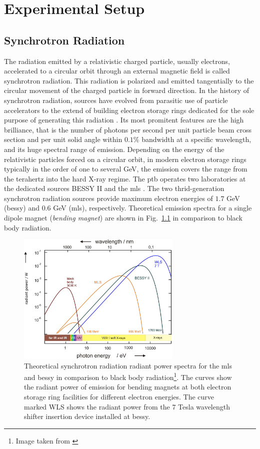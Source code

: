 \chapter{Experimental Setup}
\section{Synchrotron Radiation}
The radiation emitted by a relativistic charged particle, usually electrons, accelerated to a circular orbit through an external magnetic field is called synchrotron radiation. This radiation is polarized and emitted tangentially to the circular movement of the charged particle in forward direction. In the history of synchrotron radiation, sources have evolved from parasitic use of particle accelerators to the extend of building electron storage rings dedicated for the sole purpose of generating this radiation \cite{munro_chapter_1987}. Its most promitent features are the high brilliance, that is the number of photons per second per unit particle beam cross section and per unit solid angle within $0.1\%$ bandwidth at a specific wavelength, and its huge spectral range of emission. Depending on the energy of the relativistic particles forced on a circular orbit, in modern electron storage rings typically in the order of one to several GeV, the emission covers the range from the terahertz into the hard X-ray regime. The \gls{ptb} operates two laboratories at the dedicated sources BESSY II and the \gls{mls} \cite{brandt_metrology_2007}. The two thrid-generation synchrotron radiation sources provide maximum electron energies of $1.7$ GeV (\gls{bessy}) and $0.6$ GeV (\gls{mls}), respectively. Theoretical emission spectra for a single dipole magnet (\emph{bending magnet}) are shown in Fig.~\ref{ch_exp:fig_experimental_synchrotron_spectra} in comparison to black body radiation.
\begin{figure}
 \includegraphics[width=0.7\textwidth]{img/exp-bessy-dipole-spectrum.jpeg}
 \caption[Theoretical synchrotron radiation radiant power spectra]{Theoretical synchrotron radiation radiant power spectra for the \gls{mls} and \gls{bessy} in comparison to black body radiation\footnote{Image taken from \textcite{beckhoff_quarter-century_2009}}. The curves show the radiant power of emission for bending magnets at both electron storage ring facilities for different electron energies. The curve marked WLS shows the radiant power from the $7$ Tesla wavelength shifter insertion device installed at \gls{bessy}.}
 \label{ch_exp:fig_experimental_synchrotron_spectra}
\end{figure}

